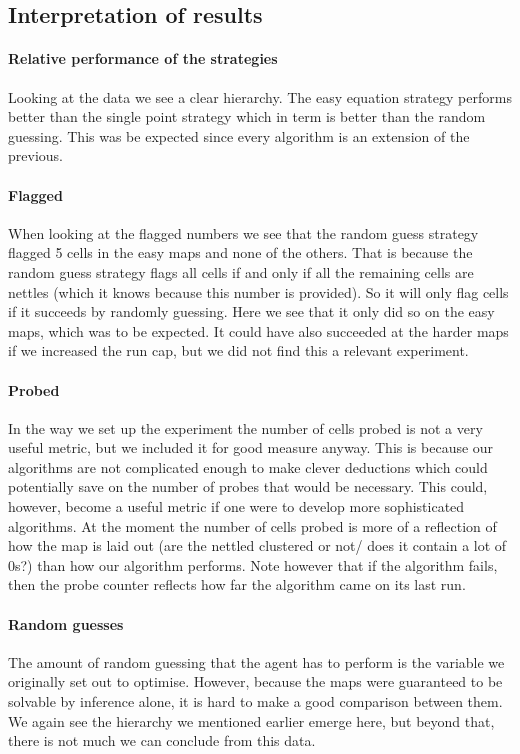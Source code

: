 \documentclass[british]{article}
\begin{document}
\subsection{Interpretation of results}
\label{interpretation}
\paragraph{Relative performance of the strategies} Looking at the data we see a clear hierarchy. The easy equation strategy performs better than the single point strategy which in term is better than the random guessing. This was be expected since every algorithm is an extension of the previous. 
\paragraph{Flagged} When looking at the flagged numbers we see that the random guess strategy flagged 5 cells in the easy maps and none of the others. That is because the random guess strategy flags all cells if and only if all the remaining cells are nettles (which it knows because this number is provided). So it will only flag cells if it succeeds by randomly guessing. Here we see that it only did so on the easy maps, which was to be expected. It could have also succeeded at the harder maps if we increased the run cap, but we did not find this a relevant experiment.
\paragraph{Probed} In the way we set up the experiment the number of cells probed is not a very useful metric, but we included it for good measure anyway. This is because our algorithms are not complicated enough to make clever deductions which could potentially save on the number of probes that would be necessary. This could, however, become a useful metric if one were to develop more sophisticated algorithms. At the moment the number of cells probed is more of a reflection of how the map is laid out (are the nettled clustered or not/ does it contain a lot of 0s?) than how our algorithm performs. Note however that if the algorithm fails, then the probe counter reflects how far the algorithm came on its last run.
\paragraph{Random guesses} The amount of random guessing that the agent has to perform is the variable we originally set out to optimise. However, because the maps were guaranteed to be solvable by inference alone, it is hard to make a good comparison between them. We again see the hierarchy we mentioned earlier emerge here, but beyond that, there is not much we can conclude from this data.
\end{document}
